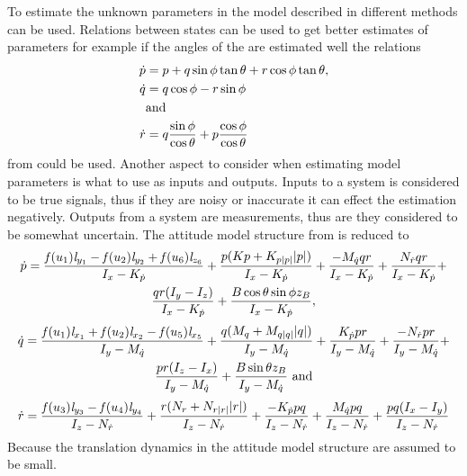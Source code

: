 To estimate the unknown parameters in the \abbrROV model described in  different methods can be used. Relations between states can be used to get better estimates of parameters for example if the angles of the \abbrROV are estimated well the relations
\begin{align}
\dot{p} &= p + q \sin \phi \tan \theta + r \cos \phi \tan \theta,\\
\dot{q} &= q \cos \phi - r \sin \phi \\
&\textrm{and} \nonumber \\
\dot{r} &= q \frac{\sin \phi}{\cos \theta} + p \frac{\cos \phi}{\cos \theta}
\end{align}
from  could be used. Another aspect to consider when estimating model parameters is what to use as inputs and outputs. Inputs to a system is considered to be true signals, thus if they are noisy or inaccurate it can effect the estimation negatively. Outputs from a system are measurements, thus are they considered to be somewhat uncertain. The attitude model structure from  is reduced to 
\begin{multline} \label{eq:p_dotWithoutTranslation}
\dot{p} = \frac{\mathit{f}(u_{1}) \mathit{l}_{y_{1}} - \mathit{f}(u_{2}) \mathit{l}_{y_{2}} + \mathit{f}(u_{6}) \mathit{l}_{z_{6}}}{I_{x} - K_{\dot{p}}} + \frac{p (Kp + K_{p|p|} |p|)}{I_{x} - K_{\dot{p}}} + \frac{-M_{\dot{q}} q r}{I_{x} - K_{\dot{p}}} + \frac{N_{\dot{r}} q r}{I_{x} - K_{\dot{p}}} +\\
\frac{q r (I_{y} - I_{z})}{I_{x} - K_{\dot{p}}} + \frac{B \cos{\theta} \sin{\phi} z_B}{I_{x} - K_{\dot{p}}},
\end{multline} 
\begin{multline} \label{eq:q_dotWithoutTranslation}
\dot{q} =\frac{\mathit{f}(u_{1}) \mathit{l}_{x_{1}} + \mathit{f}(u_{2}) \mathit{l}_{x_{2}} - \mathit{f}(u_{5}) \mathit{l}_{x_{5}}}{I_{y} - M_{\dot{q}}} + \frac{q (M_{q} + M_{q|q|} |q|)}{I_{y} - M_{\dot{q}}} + \frac{K_{\dot{p}} p r}{I_{y} - M_{\dot{q}}} + \frac{-N_{\dot{r}} p r}{I_{y} - M_{\dot{q}}} +\\
\frac{p r (I_{z} - I_{x})}{I_{y} - M_{\dot{q}}} + \frac{B \sin{\theta} z_B}{I_{y} - M_{\dot{q}}}\ \textrm{and}
\end{multline} 
\begin{multline} \label{eq:r_dotWithoutTranslation}
\dot{r} = \frac{\mathit{f}(u_{3}) \mathit{l}_{y_{3}} - \mathit{f}(u_{4}) \mathit{l}_{y_{4}}}{I_{z} - N_{\dot{r}}} + \frac{r (N_{r} + N_{r|r|} |r|)}{I_{z} - N_{\dot{r}}} + \frac{-K_{\dot{p}} p q}{I_{z} - N_{\dot{r}}} + \frac{M_{\dot{q}} p q}{I_{z} - N_{\dot{r}}} + \frac{p q (I_{x} - I_{y})}{I_{z} - N_{\dot{r}}}
\end{multline} 
Because the translation dynamics in the attitude model structure are assumed to be small.

